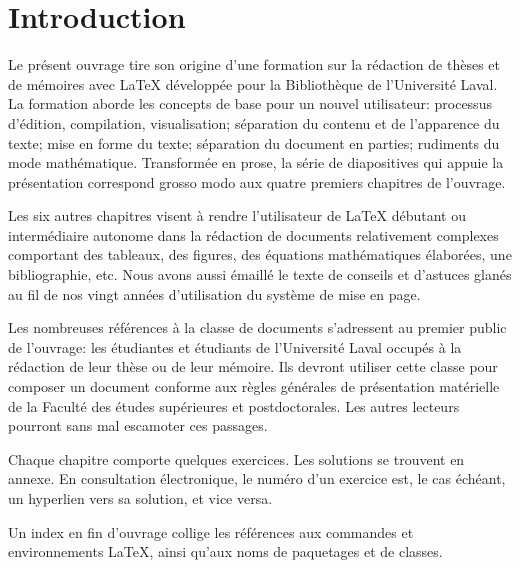 
\chapter{Introduction}
\label{chap:introduction}

Le présent ouvrage tire son origine d'une formation sur la rédaction
de thèses et de mémoires avec {\LaTeX} développée pour la Bibliothèque
de l'Université Laval. La formation aborde les concepts de base pour
un nouvel utilisateur: processus d'édition, compilation,
visualisation; séparation du contenu et de l'apparence du texte; mise
en forme du texte; séparation du document en parties; rudiments du
mode mathématique. Transformée en prose, la série de diapositives qui
appuie la présentation correspond grosso modo aux quatre premiers
chapitres de l'ouvrage.

Les six autres chapitres visent à rendre l'utilisateur de {\LaTeX}
débutant ou intermédiaire autonome dans la rédaction de documents
relativement complexes comportant des tableaux, des figures, des
équations mathématiques élaborées, une bibliographie, etc. Nous avons
aussi émaillé le texte de conseils et d'astuces glanés au fil de nos
vingt années d'utilisation du système de mise en page.

Les nombreuses références à la classe de documents 
s'adressent au premier public de l'ouvrage: les étudiantes et
étudiants de l'Université Laval occupés à la rédaction de leur thèse
ou de leur mémoire. Ils devront utiliser cette classe pour composer un
document conforme aux règles générales de présentation matérielle de
la Faculté des études supérieures et postdoctorales. Les autres
lecteurs pourront sans mal escamoter ces passages.

Chaque chapitre comporte quelques exercices. Les solutions se trouvent
en annexe. En consultation électronique, le numéro d'un exercice est,
le cas échéant, un hyperlien vers sa solution, et vice versa.

Un index en fin d'ouvrage collige les références aux commandes et
environnements {\LaTeX}, ainsi qu'aux noms de paquetages et de
classes.

